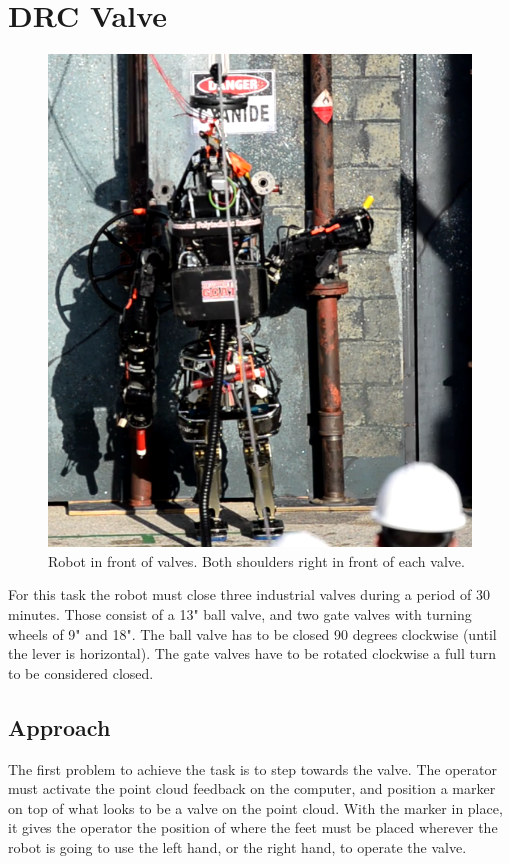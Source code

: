 \documentclass{article}
\begin{document}
\section{DRC Valve}
\begin{figure}
  \begin{center}
    \includegraphics[scale=0.2]{images/turn_valve.png}
  \end{center}
  \caption{Robot in front of valves. Both shoulders right in front of each valve.}
\end{figure}
For this task the robot must close three industrial valves during a period of 30 minutes. Those consist of a 13" ball valve, and two gate valves with turning wheels of 9" and 18". The ball valve has to be closed 90 degrees clockwise (until the lever is horizontal). The gate valves have to be rotated clockwise a full turn to be considered closed.  \cite{valvetask}

\subsection{Approach}
The first problem to achieve the task is to step towards the valve. The operator must activate the point cloud feedback on the computer, and position a marker on top of what looks to be a valve on the point cloud. With the marker in place, it gives the operator the position of where the feet must be placed wherever the robot is going to use the left hand, or the right hand, to operate the valve. 
\end{document}
